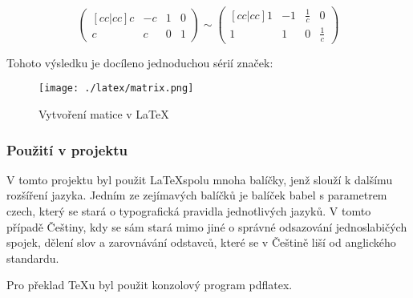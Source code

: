 \documentclass[main.tex]{subfiles}
\begin{document}
$$
\begin{pmatrix}[cc|cc]
	c & -c & 1 & 0 \\
	c & c & 0 & 1 
\end{pmatrix}
\sim
\begin{pmatrix}[cc|cc]
	1 & -1 & \frac{1}{c} & 0 \\
	1 & 1 & 0 & \frac{1}{c} 
\end{pmatrix}
$$

Tohoto výsledku je docíleno jednoduchou sérií značek: %
		\begin{figure}[h]
			\centering
			\texttt{[image: ./latex/matrix.png]}
			\caption{Vytvoření matice v \LaTeX}
		\end{figure}

\subsubsection{Použití v projektu}
V tomto projektu byl použit \LaTeX spolu mnoha balíčky, jenž slouží k dalšímu rozšíření jazyka. Jedním ze zejímavých balíčků je balíček babel s parametrem czech, který se stará o typografická pravidla jednotlivých jazyků. V tomto případě Češtiny, kdy se sám stará mimo jiné o správné odsazování jednoslabičých spojek, dělení slov a zarovnávání odstavců, které se v Češtině liší od anglického standardu. 

Pro překlad TeXu byl použit konzolový program pdflatex.
\end{document}
